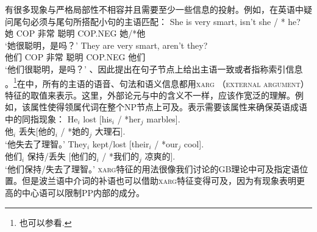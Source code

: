 有很多现象与严格局部性不相容并且需要至少一些信息的投射。例如，在英语中疑问尾句必须与尾句所搭配小句的主语匹配：
\eal
\ex 
\gll She is very smart, isn't she / * he?\\
	 她 COP 非常 聪明 COP.NEG 她/*他\\
\glt `她很聪明，是吗？'
\ex 
\gll They are very smart, aren't they?\\
	 他们 COP 非常 聪明 COP.NEG 他们\\
\glt `他们很聪明，是吗？'
\zl
\citet{BF99a}、\citet{FB2003a}因此提出在句子节点上给出主语一致或者指称索引信息 。\footnote{
  也可以参看.
}在\citet{Sag2007a}中，所有的主语的语音、句法和语义信息都用\textsc{xarg} （\textsc{external argument}）特征的取值来表示。这里，外部论元与\gbtc 中的含义不一样，应该作宽泛的理解。例如，该属性使得领属代词在整个NP节点上可及。\citet{Sag2007a}表示需要该属性来确保英语成语中的同指现象：
\eal
\ex 
\gll He$_i$ lost [his$_i$ / *her$_j$ marbles].\\
	 他$_i$ 丢失[他的$_i$ / *她的$_j$ 大理石].\\
\glt `他失去了理智。'
\ex 
\gll They$_i$ kept/lost [their$_i$ / *our$_j$ cool].\\
	 他们$_i$ 保持/丢失 [他们的$_i$ / *我们的$_j$ 凉爽的].\\
\glt `他们保持/失去了理智。'
\zl
\addlines
\textsc{xarg}特征的用法很像我们讨论的GB理论中可及指定语位置。但是波兰语中介词的补语也可以借助\textsc{xarg}特征变得可及，因为有现象表明更高的中心语可以限制PP内部的成分\citep[\S~5.4.1.2]{Prze99b}。

